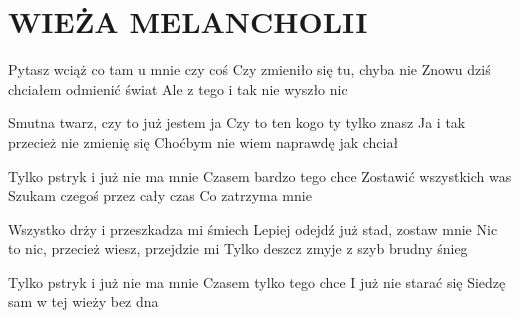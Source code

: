 \documentclass[../../../songbook.tex]{subfiles}
\begin{document}
\TabPositions{8cm} %
\section*{WIEŻA MELANCHOLII}
{}
\vspace{0.5cm}
Pytasz wciąż co tam u mnie czy coś 	 \newline 
Czy zmieniło się tu, chyba nie 		 \newline
Znowu dziś chciałem odmienić świat	 \newline
Ale z tego i tak nie wyszło nic	 \newline

Smutna twarz, czy to już jestem ja	 \newline
Czy to ten kogo ty tylko znasz	 \newline
Ja i tak przecież nie zmienię się	 \newline
Choćbym nie wiem naprawdę jak chciał	 \newline

\-\hspace{1cm} Tylko pstryk i już nie ma mnie 	 \newline
\-\hspace{1cm} Czasem bardzo tego chce 			 \newline      
\-\hspace{1cm} Zostawić wszystkich was			 \newline
\-\hspace{1cm} Szukam czegoś przez cały czas	 \newline 
\-\hspace{1cm} Co zatrzyma mnie 				 \newline

Wszystko drży i przeszkadza mi śmiech	 \newline
Lepiej odejdź już stad, zostaw mnie	 \newline
Nic to nic, przecież wiesz, przejdzie mi	 \newline
Tylko deszcz zmyje z szyb brudny śnieg	 \newline

\-\hspace{1cm} Tylko pstryk i już nie ma mnie 	 \newline
\-\hspace{1cm} Czasem tylko tego chce 		 \newline	   
\-\hspace{1cm} I już nie starać się 		 \newline		
\-\hspace{1cm} Siedzę sam w tej wieży bez dna 		 \newline
\end{document}
